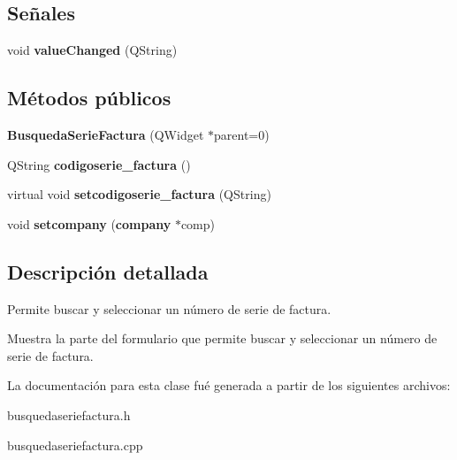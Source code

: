 \subsection*{Se\~{n}ales}
\begin{CompactItemize}
\item 
void {\bf value\-Changed} (QString)\label{classBusquedaSerieFactura_l0}

\end{CompactItemize}
\subsection*{M\'{e}todos p\'{u}blicos}
\begin{CompactItemize}
\item 
{\bf Busqueda\-Serie\-Factura} (QWidget $\ast$parent=0)\label{classBusquedaSerieFactura_a0}

\item 
QString {\bf codigoserie\_\-factura} ()\label{classBusquedaSerieFactura_a1}

\item 
virtual void {\bf setcodigoserie\_\-factura} (QString)\label{classBusquedaSerieFactura_a2}

\item 
void {\bf setcompany} ({\bf company} $\ast$comp)\label{classBusquedaSerieFactura_a3}

\end{CompactItemize}


\subsection{Descripci\'{o}n detallada}
Permite buscar y seleccionar un n\'{u}mero de serie de factura. 

Muestra la parte del formulario que permite buscar y seleccionar un n\'{u}mero de serie de factura. 



La documentaci\'{o}n para esta clase fu\'{e} generada a partir de los siguientes archivos:\begin{CompactItemize}
\item 
busquedaseriefactura.h\item 
busquedaseriefactura.cpp\end{CompactItemize}
